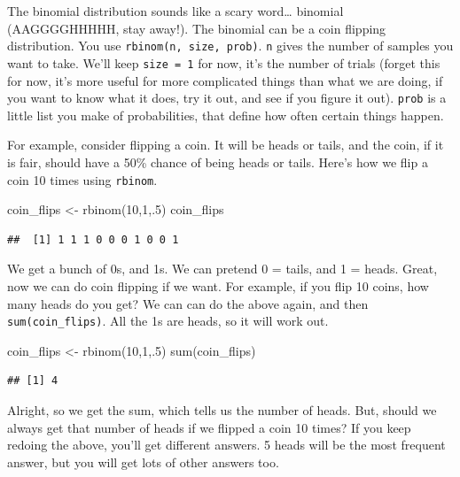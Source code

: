 \documentclass[
]{book}
\newenvironment{Shaded}{\begin{snugshade}}{\end{snugshade}}
\newcommand{\DecValTok}[1]{\textcolor[rgb]{0.00,0.00,0.81}{#1}}
\newcommand{\FunctionTok}[1]{\textcolor[rgb]{0.00,0.00,0.00}{#1}}
\newcommand{\NormalTok}[1]{#1}
\newcommand{\OtherTok}[1]{\textcolor[rgb]{0.56,0.35,0.01}{#1}}
\begin{document}
The binomial distribution sounds like a scary word\ldots{} binomial (AAGGGGHHHHH, stay away!). The binomial can be a coin flipping distribution. You use \texttt{rbinom(n,\ size,\ prob)}. \texttt{n} gives the number of samples you want to take. We'll keep \texttt{size\ =\ 1} for now, it's the number of trials (forget this for now, it's more useful for more complicated things than what we are doing, if you want to know what it does, try it out, and see if you figure it out). \texttt{prob} is a little list you make of probabilities, that define how often certain things happen.

For example, consider flipping a coin. It will be heads or tails, and the coin, if it is fair, should have a 50\% chance of being heads or tails. Here's how we flip a coin 10 times using \texttt{rbinom}.

\begin{Shaded}
\begin{Highlighting}[]
\NormalTok{coin\_flips }\OtherTok{\textless{}{-}} \FunctionTok{rbinom}\NormalTok{(}\DecValTok{10}\NormalTok{,}\DecValTok{1}\NormalTok{,.}\DecValTok{5}\NormalTok{)}
\NormalTok{coin\_flips}
\end{Highlighting}
\end{Shaded}

\begin{verbatim}
##  [1] 1 1 1 0 0 0 1 0 0 1
\end{verbatim}

We get a bunch of 0s, and 1s. We can pretend 0 = tails, and 1 = heads. Great, now we can do coin flipping if we want. For example, if you flip 10 coins, how many heads do you get? We can can do the above again, and then \texttt{sum(coin\_flips)}. All the 1s are heads, so it will work out.

\begin{Shaded}
\begin{Highlighting}[]
\NormalTok{coin\_flips }\OtherTok{\textless{}{-}} \FunctionTok{rbinom}\NormalTok{(}\DecValTok{10}\NormalTok{,}\DecValTok{1}\NormalTok{,.}\DecValTok{5}\NormalTok{)}
\FunctionTok{sum}\NormalTok{(coin\_flips)}
\end{Highlighting}
\end{Shaded}

\begin{verbatim}
## [1] 4
\end{verbatim}

Alright, so we get the sum, which tells us the number of heads. But, should we always get that number of heads if we flipped a coin 10 times? If you keep redoing the above, you'll get different answers. 5 heads will be the most frequent answer, but you will get lots of other answers too.
\end{document}
